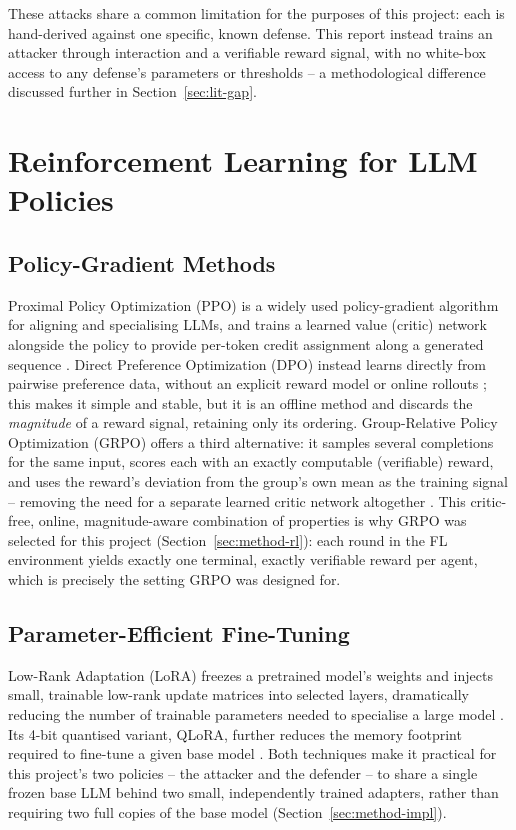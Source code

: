 These attacks share a common limitation for the purposes of this project: each is hand-derived against one specific, known defense. This report instead trains an attacker through interaction and a verifiable reward signal, with no white-box access to any defense's parameters or thresholds -- a methodological difference discussed further in Section~\ref{sec:lit-gap}.

\section{Reinforcement Learning for LLM Policies}
\label{sec:lit-rl}

\subsection{Policy-Gradient Methods}
Proximal Policy Optimization (PPO) is a widely used policy-gradient algorithm for aligning and specialising LLMs, and trains a learned value (critic) network alongside the policy to provide per-token credit assignment along a generated sequence \citep{ppo,ouyang2022}. Direct Preference Optimization (DPO) instead learns directly from pairwise preference data, without an explicit reward model or online rollouts \citep{dpo}; this makes it simple and stable, but it is an offline method and discards the \emph{magnitude} of a reward signal, retaining only its ordering. Group-Relative Policy Optimization (GRPO) offers a third alternative: it samples several completions for the same input, scores each with an exactly computable (verifiable) reward, and uses the reward's deviation from the group's own mean as the training signal -- removing the need for a separate learned critic network altogether \citep{grpo}. This critic-free, online, magnitude-aware combination of properties is why GRPO was selected for this project (Section~\ref{sec:method-rl}): each round in the FL environment yields exactly one terminal, exactly verifiable reward per agent, which is precisely the setting GRPO was designed for.

\subsection{Parameter-Efficient Fine-Tuning}
Low-Rank Adaptation (LoRA) freezes a pretrained model's weights and injects small, trainable low-rank update matrices into selected layers, dramatically reducing the number of trainable parameters needed to specialise a large model \citep{lora2022}. Its 4-bit quantised variant, QLoRA, further reduces the memory footprint required to fine-tune a given base model \citep{qlora2023}. Both techniques make it practical for this project's two policies -- the attacker and the defender -- to share a single frozen base LLM behind two small, independently trained adapters, rather than requiring two full copies of the base model (Section~\ref{sec:method-impl}).

